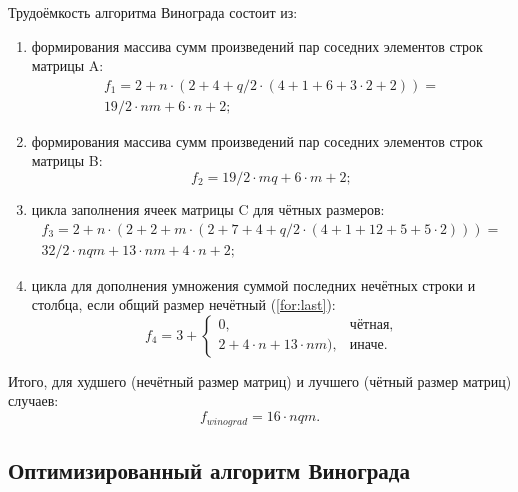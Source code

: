 Трудоёмкость алгоритма Винограда состоит из:
\begin{enumerate}
	\item  формирования массива сумм произведений пар соседних элементов строк матрицы A:
	\begin{equation}
	\begin{array}{c}
	f_1 = 2 + n  \cdot(2 + 4 + q/2  \cdot (4 + 1 + 6 + 3  \cdot 2 + 2)) =  \\
		19/2 \cdot nm + 6 \cdot n + 2 ;
	\end{array}
	\end{equation}
	
	\item  формирования массива сумм произведений пар соседних элементов строк матрицы B:
	\begin{equation}
	f_2 = 19/2 \cdot mq + 6 \cdot m + 2;
	\end{equation}
	
	\item цикла заполнения ячеек матрицы C для чётных размеров:
	\begin{equation}
	\begin{array}{c}
	f_3 = 2 + n \cdot (2 + 2 + m \cdot (2 + 7 + 4 + q/2 \cdot (4 + 1 + 12 + 5 + 5 \cdot 2))) = \\
		32/2 \cdot nqm + 13 \cdot nm + 4 \cdot n + 2 ;
	\end{array}
	\end{equation}
	
	\item цикла для дополнения умножения суммой последних нечётных строки и столбца, если общий размер нечётный (\ref{for:last}):
	\begin{equation}
	\label{for:last}
	f_4 =  3 + \begin{cases}
	0, & \text{чётная,}\\
	2 +4 \cdot n + 13 \cdot nm), & \text{иначе.}
	\end{cases}
	\end{equation}
\end{enumerate}

Итого, для худшего (нечётный размер матриц) и лучшего (чётный размер матриц) случаев:
\begin{equation}
\label{for:bad}
f_{winograd} = 16 \cdot nqm.
\end{equation}

\subsection{Оптимизированный алгоритм Винограда}

